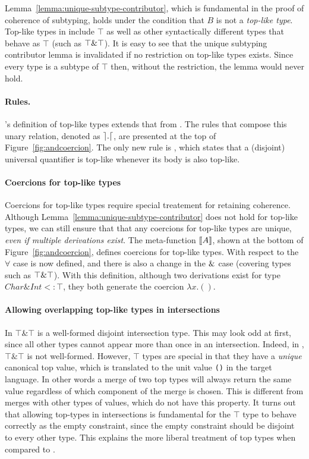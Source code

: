 Lemma~\ref{lemma:unique-subtype-contributor}, which is fundamental in
the proof of coherence of subtyping, holds under the condition
that $B$ is not a \emph{top-like type}. Top-like types in \name
include $\top$ as well as other syntactically different types that
behave as $\top$ (such as $\top \& \top$). It is easy to see that the unique
subtyping contributor lemma is invalidated if no restriction on
top-like types exists. Since every type is a subtype of $\top$ 
then, without the restriction, the lemma would never hold.

\paragraph{Rules.}
\name's definition of top-like types extends that from \oldname.  The
rules that compose this unary relation, denoted as $\rceil  .  \lceil$,
are presented at the top of Figure~\ref{fig:andcoercion}.  The only
new rule is , which states that a
(disjoint) universal quantifier is top-like whenever its body is also
top-like.

\paragraph{Coercions for top-like types} Coercions for top-like types 
require special treatement for retaining coherence. Although Lemma~\ref{lemma:unique-subtype-contributor}
does not hold for top-like types, we can still ensure that that any 
coercions for top-like types are unique, \emph{even if multiple
  derivations exist}. The meta-function
$\llbracket A \rrbracket$, shown at the bottom of Figure~\ref{fig:andcoercion},
 defines coercions for top-like types. With respect to \oldname the $\forall$ case is
now defined, and there is also a change in the $\&$ case (covering types such as $\top
\& \top$). With this definition, although two derivations
exist for type $Char\&Int <: \top$, they both generate the coercion 
$\lambda x . ()$.
 
\paragraph{Allowing overlapping top-like types in intersections} 
In \name $\top \& \top$ is a well-formed disjoint intersection type.
This may look odd at first, since all other types
cannot appear more than once in an intersection. Indeed, in \oldname, 
$\top \& \top$ is not well-formed. However, $\top$ types are special 
in that they have a \emph{unique} canonical top value, which is
translated to the unit value \lstinline{()} in the target language. In
other words a merge of two top types will always return the same value 
regardless of which component of the merge is chosen. This is different 
from merges with other types of values, which do not have this
property.  
It turns out that allowing top-types in intersections is fundamental 
for the $\top$ type to behave correctly as the empty constraint, since
the empty constraint should be disjoint to every other
type. This explains the more liberal treatment of top types \name when
compared to \oldname.

